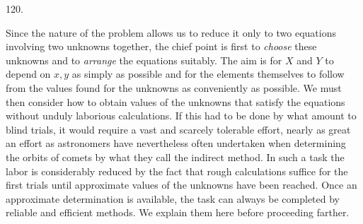 \par{}\medskip
\begin{center}\hypertarget{native-166-article120}{}120.\end{center}
Since the nature of the problem allows us to reduce it only to two equations involving two unknowns together, the chief point is first to \emph{choose} these unknowns and to \emph{arrange} the equations suitably. The aim is for $X$ and $Y$ to depend on $x,y$ as simply as possible and for the elements themselves to follow from the values found for the unknowns as conveniently as possible. We must then consider how to obtain values of the unknowns that satisfy the equations without unduly laborious calculations. If this had to be done by what amount to blind trials, it would require a vast and scarcely tolerable effort, nearly as great an effort as astronomers have nevertheless often undertaken when determining the orbits of comets by what they call the indirect method. In such a task the labor is considerably reduced by the fact that rough calculations suffice for the first trials until approximate values of the unknowns have been reached. Once an approximate determination is available, the task can always be completed by reliable and efficient methods. We explain them here before proceeding farther.

